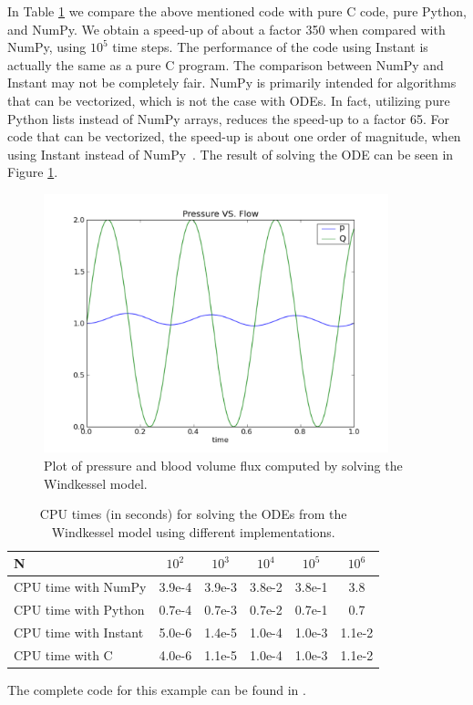 In Table \ref{wilbers:fig:speed-up} we compare the above mentioned
code with pure C code, pure Python, and NumPy.  We obtain a speed-up
of about a factor 350 when compared with NumPy, using $10^5$ time
steps. The performance of the code using Instant is actually the same
as a pure C program.  The comparison between NumPy and Instant may not
be completely fair. NumPy is primarily intended for algorithms that
can be vectorized, which is not the case with ODEs. In fact, utilizing
pure Python lists instead of NumPy arrays, reduces the speed-up to a
factor 65. For code that can be vectorized, the speed-up is about one
order of magnitude, when using Instant instead of
NumPy~\citep{WilbersLangtangenOdegaard2009}.  The result of solving the ODE
can be seen in Figure
\ref{wilbers:fig:fig1}.

\begin{figure}
\begin{center}
\includegraphics[width=100mm]{chapters/wilbers/pdf/pressure_plot.pdf}
\caption{Plot of pressure and blood volume flux computed by solving the Windkessel model.}
\label{wilbers:fig:fig1}
\end{center}
\end{figure}

\begin{table}
\begin{center}
\begin{tabular}{|l|c|c|c|c|c|} \hline
N                     & $10^2$     & $10^3$ & $10^4$ &  $10^5$ &  $10^6$ \\ \hline
CPU time with NumPy   & 3.9e-4  & 3.9e-3 & 3.8e-2 & 3.8e-1 & 3.8     \\ \hline
CPU time with Python  & 0.7e-4  & 0.7e-3 & 0.7e-2 & 0.7e-1 & 0.7     \\ \hline
CPU time with Instant & 5.0e-6  & 1.4e-5 & 1.0e-4 & 1.0e-3 & 1.1e-2  \\ \hline
CPU time with C       & 4.0e-6  & 1.1e-5 & 1.0e-4 & 1.0e-3 & 1.1e-2  \\ \hline
\end{tabular}
\caption{CPU times (in seconds) for solving the ODEs from the  Windkessel model using different implementations.}
\label{wilbers:fig:speed-up}
\end{center}
\end{table}
The complete code for this example can be found in .


